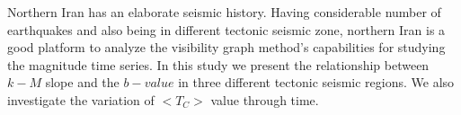 \noindent
Northern Iran has an elaborate seismic history.  Having considerable number of earthquakes and also being in different tectonic seismic zone, northern Iran is a good platform to analyze the visibility graph method's capabilities for studying the magnitude time series. In this study we present the relationship between $k-M$ slope and the $b-value$ in three different tectonic seismic regions. We also investigate the variation of $<T_C>$ value through time.


